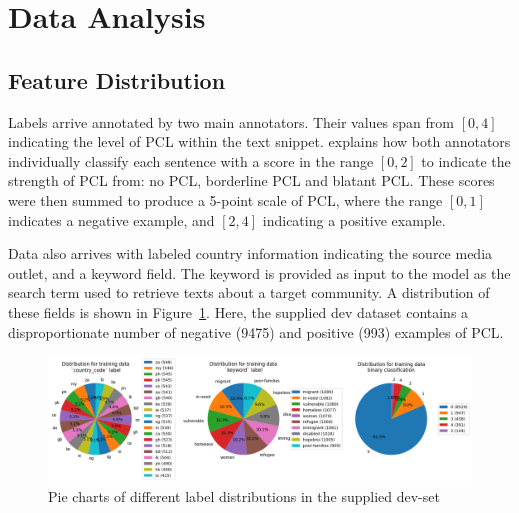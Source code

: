 \documentclass[11pt,a4paper]{article}
\begin{document}
\section{Data Analysis}



\subsection{Feature Distribution}\label{sect:feature-distribution}

Labels arrive annotated by two main annotators. Their values span from $[0,4]$ indicating the level of PCL within the text snippet. \citet{perez-almendros-etal-2020-dont} explains how both annotators individually classify each sentence with a score in the range $[0,2]$ to indicate the strength of PCL from: no PCL, borderline PCL and blatant PCL. These scores were then summed to produce a 5-point scale of PCL, where the range $[0,1]$ indicates a negative example, and $[2,4]$ indicating a positive example.

Data also arrives with labeled country information indicating the source media outlet, and a keyword field. The keyword is provided as input to the model as the search term used to retrieve texts about a target community. A distribution of these fields is shown in Figure~\ref{fig:dev-set-distribution}. Here, the supplied dev dataset contains a disproportionate number of negative (9475) and positive (993) examples of PCL.

\begin{figure}[h!]
    \centering
    \includegraphics[trim=0cm 0cm 0cm 0cm, clip, width=\linewidth]{figures/test_distribution.png}
    \caption{Pie charts of different label distributions in the supplied dev-set}
    \label{fig:dev-set-distribution}
\end{figure}
\end{document}
